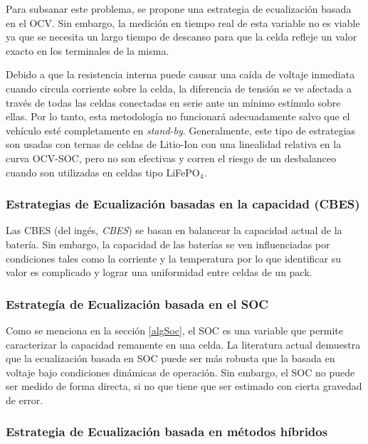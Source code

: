 Para subsanar este problema, se propone una estrategia de ecualizaci\'on basada
en el \acrshort{OCV}. Sin embargo, la medici\'on en tiempo real de esta variable
no es viable ya que se necesita un largo tiempo de descanso para que la celda
refleje un valor exacto en los terminales de la misma.

Debido a que la resistencia interna puede causar una ca\'ida de voltaje
inmediata cuando circula corriente sobre la celda, la diferencia de tensi\'on se
ve afectada a trav\'es de todas las celdas conectadas en serie ante un m\'inimo
est\'imulo sobre ellas. Por lo tanto, esta metodolog\'ia no funcionar\'a
adecuadamente salvo que el veh\'iculo est\'e completamente en \emph{stand-by}.
Generalmente, este tipo de estrategias son usadas con ternas de celdas de
Litio-Ion con una linealidad relativa en la curva \acrshort{OCV}-\acrshort{SOC},
pero no son efectivas y corren el riesgo de un desbalanceo cuando son utilizadas
en celdas tipo LiFeP$\mathrm{O_4}$. 

\subsubsection{Estrategias de Ecualizaci\'on basadas en la capacidad
(\acrshort{CBES})}

Las \acrshort{CBES} (del ing\'es, \emph{\acrlong{CBES}}) se basan en balancear
la capacidad actual de la bater\'ia. Sin embargo, la capacidad de las bater\'ias
se ven influenciadas por condiciones tales como la corriente y la temperatura
por lo que identificar su valor es complicado y lograr una uniformidad entre
celdas de un pack.

\subsubsection{Estrateg\'ia de Ecualizaci\'on basada en el \acrshort{SOC}}

Como se menciona en la secci\'on \ref{algSoc}, el \acrshort{SOC} es una variable
que permite caracterizar la capacidad remanente en una celda. La literatura
actual demuestra que la ecualizaci\'on basada en \acrshort{SOC} puede ser m\'as 
robusta que la basada en voltaje bajo condiciones din\'amicas de operaci\'on.
Sin embargo, el \acrshort{SOC} no puede ser medido de forma directa, si no que
tiene que ser estimado con cierta gravedad de error.

\subsubsection{Estrategia de Ecualizaci\'on basada en m\'etodos h\'ibridos}

